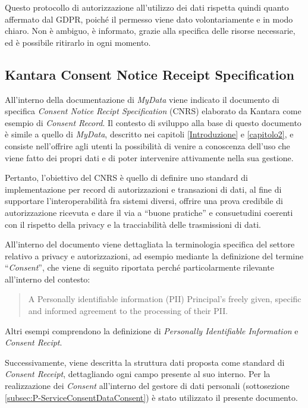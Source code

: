 Questo protocollo di autorizzazione all’utilizzo dei dati rispetta quindi quanto affermato dal GDPR, poich\'e il permesso viene dato volontariamente e in modo chiaro. Non \`e ambiguo, \`e informato, grazie alla specifica delle risorse necessarie, ed \`e possibile ritirarlo in ogni momento.

\subsection{Kantara Consent Notice Receipt Specification}
All’interno della documentazione di \textit{MyData} \cite{githubmydatastack} viene indicato il documento di specifica \textit{Consent Notice Recipt Specification} (CNRS) elaborato da Kantara \cite{kantaraconsent} come esempio di \textit{Consent Record}. Il contesto di sviluppo alla base di questo documento \`e simile a quello di \textit{MyData}, descritto nei capitoli \ref{Introduzione} e \ref{capitolo2}, e consiste nell’offrire agli utenti la possibilit\`a di venire a conoscenza dell’uso che viene fatto dei propri dati e di poter intervenire attivamente nella sua gestione.

Pertanto, l’obiettivo del CNRS \`e quello di definire uno standard di implementazione per record di autorizzazioni e transazioni di dati, al fine di supportare l’interoperabilit\`a fra sistemi diversi, offrire una prova credibile di autorizzazione ricevuta e dare il via a “buone pratiche” e consuetudini coerenti con il rispetto della privacy e la tracciabilit\`a delle trasmissioni di dati.

All’interno del documento viene dettagliata la terminologia specifica del settore relativo a privacy e autorizzazioni, ad esempio mediante la definizione del termine “\textit{Consent}”, che viene di seguito riportata perch\'e particolarmente rilevante all’interno del contesto:
\begin{quote}
A Personally identifiable information (PII) Principal’s freely given, specific and informed agreement to the processing of their PII.
\end{quote}
Altri esempi comprendono la definizione di \textit{Personally Identifiable Information} e \textit{Consent Recipt}.

Successivamente, viene descritta la struttura dati proposta come standard di \textit{Consent Receipt}, dettagliando ogni campo presente al suo interno. Per la realizzazione dei \textit{Consent} all’interno del gestore di dati personali (sottosezione \ref{subsec:P-ServiceConsentDataConsent}) è stato utilizzato il presente documento.

